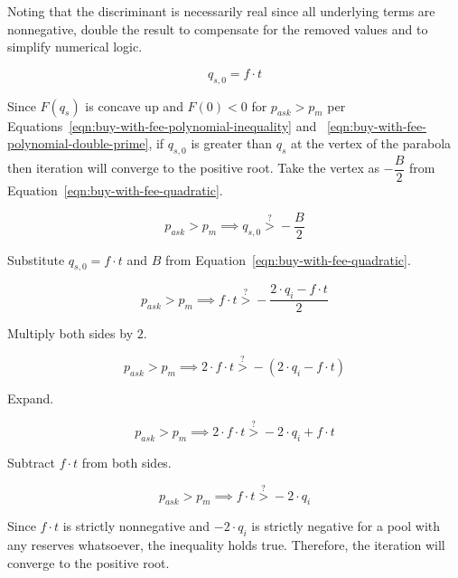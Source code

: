 Noting that the discriminant is necessarily real since all underlying terms are
nonnegative, double the result to compensate for the removed values and to simplify
numerical logic.

\begin{equation*}
	q_{s, 0} = f \cdot t
\end{equation*}

Since $F(q_s)$ is concave up and $F(0) < 0$ for $p_{ask} > p_m$ per
Equations~\ref{eqn:buy-with-fee-polynomial-inequality} and%
~\ref{eqn:buy-with-fee-polynomial-double-prime}, if $q_{s, 0}$ is greater than $q_s$ at
the vertex of the parabola then iteration will converge to the positive root. Take the
vertex as $-\dfrac{B}{2}$ from Equation~\ref{eqn:buy-with-fee-quadratic}.

\begin{equation*}
	p_{ask} > p_m \implies q_{s, 0} \stackrel{?}{>} - \frac{B}{2}
\end{equation*}

Substitute $q_{s, 0} = f \cdot t$ and $B$ from
Equation~\ref{eqn:buy-with-fee-quadratic}.

\begin{equation*}
	p_{ask} > p_m \implies f \cdot t \stackrel{?}{>} - \frac{2 \cdot q_i - f \cdot t}{2}
\end{equation*}

Multiply both sides by $2$.

\begin{equation*}
	p_{ask} > p_m \implies 2 \cdot f \cdot t \stackrel{?}{>} - (2 \cdot q_i - f \cdot t)
\end{equation*}

Expand.

\begin{equation*}
	p_{ask} > p_m \implies 2 \cdot f \cdot t \stackrel{?}{>} - 2 \cdot q_i + f \cdot t
\end{equation*}

Subtract $f \cdot t$ from both sides.

\begin{equation*}
	p_{ask} > p_m \implies f \cdot t \stackrel{?}{>} - 2 \cdot q_i
\end{equation*}

Since $f \cdot t$ is strictly nonnegative and $-2 \cdot q_i$ is strictly negative for
a pool with any reserves whatsoever, the inequality holds true. Therefore, the iteration
will converge to the positive root.
